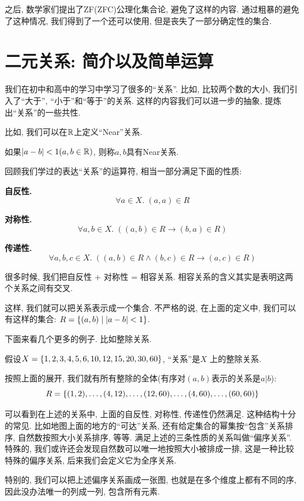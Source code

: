 之后, 数学家们提出了ZF(ZFC)公理化集合论, 避免了这样的内容. 通过粗暴的避免了这种情况, 我们得到了一个还可以使用, 但是丧失了一部分确定性的集合. 


\section{二元关系: 简介以及简单运算}

我们在初中和高中的学习中学习了很多的``关系''. 比如, 比较两个数的大小, 我们引入了``大于'', ``小于''和``等于''的关系. 这样的内容我们可以进一步的抽象, 提炼出``关系''的一些共性. 

比如, 我们可以在$\mathbb{R}$上定义``Near''关系.

\begin{eg}
    如果$|a - b| < 1(a, b \in \mathbb{R})$, 则称$a, b$具有Near关系. 
\end{eg}

回顾我们学过的表达``关系''的运算符, 相当一部分满足下面的性质: 

\textbf{自反性. }
$$\forall a \in X.\; (a, a) \in R$$

\textbf{对称性. }
$$\forall a, b \in X.\; ((a, b) \in R \to (b, a) \in R)$$

\textbf{传递性. }
$$\forall a, b, c \in X.\; ((a, b) \in R \land (b, c) \in R \to (a, c) \in R)$$

很多时候, 我们把自反性 + 对称性 = 相容关系. 相容关系的含义其实是表明这两个关系之间有交叉.

这样, 我们就可以把关系表示成一个集合. 不严格的说, 在上面的定义中, 我们可以有这样的集合: $R = \{(a, b) \mid |a - b| < 1\}$. 

下面来看几个更多的例子. 比如整除关系. 

\begin{eg}
    假设$X = \{1, 2, 3, 4, 5, 6, 10, 12, 15, 20, 30, 60\}$, ``关系''是$X$ 上的整除关系. 
\end{eg}

按照上面的展开, 我们就有所有整除的全体(有序对$(a,b)$表示的关系是$a|b$):
$$R = \{(1, 2), \dots, (4, 12), \dots, (12, 60), \dots, (4, 60), \dots, (60, 60)\}$$

可以看到在上述的关系中, 上面的自反性, 对称性, 传递性仍然满足. 这种结构十分的常见. 比如地图上面的地方的``可达''关系, 还有给定集合的幂集按``包含''关系排序, 自然数按照大小关系排序, 等等. 满足上述的三条性质的关系叫做``偏序关系''. 特殊的, 我们或许还会发现自然数可以唯一地按照大小被排成一排, 这是一种比较特殊的偏序关系, 后来我们会定义它为全序关系. 

特别的, 我们可以把上述偏序关系画成一张图, 也就是在多个维度上都有不同的序, 因此没办法唯一的列成一列, 包含所有元素. 

